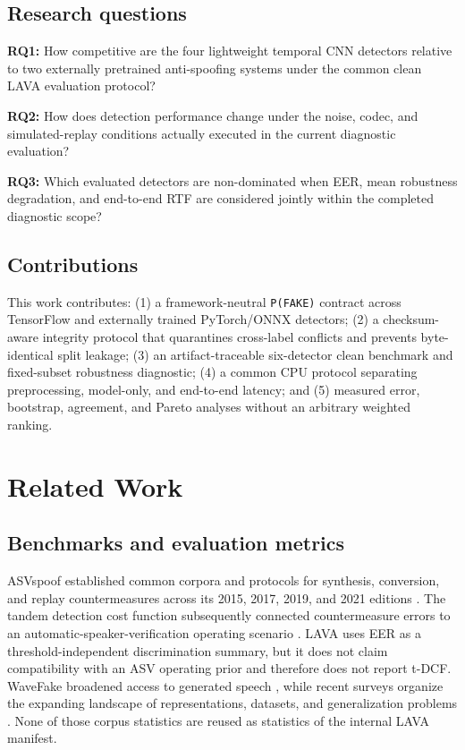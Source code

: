 \documentclass[10pt,journal]{IEEEtran}
\begin{document}
\subsection{Research questions}
\textbf{RQ1:} How competitive are the four lightweight temporal CNN detectors relative to two externally pretrained anti-spoofing systems under the common clean LAVA evaluation protocol?

\textbf{RQ2:} How does detection performance change under the noise, codec, and simulated-replay conditions actually executed in the current diagnostic evaluation?

\textbf{RQ3:} Which evaluated detectors are non-dominated when EER, mean robustness degradation, and end-to-end RTF are considered jointly within the completed diagnostic scope?

\subsection{Contributions}
This work contributes: (1) a framework-neutral \texttt{P(FAKE)} contract across TensorFlow and externally trained PyTorch/ONNX detectors; (2) a checksum-aware integrity protocol that quarantines cross-label conflicts and prevents byte-identical split leakage; (3) an artifact-traceable six-detector clean benchmark and fixed-subset robustness diagnostic; (4) a common CPU protocol separating preprocessing, model-only, and end-to-end latency; and (5) measured error, bootstrap, agreement, and Pareto analyses without an arbitrary weighted ranking.

\section{Related Work}
\subsection{Benchmarks and evaluation metrics}
ASVspoof established common corpora and protocols for synthesis, conversion, and replay countermeasures across its 2015, 2017, 2019, and 2021 editions \cite{wu2015asvspoof,kinnunen2017asvspoof,todisco2019asvspoof,yamagishi2021asvspoof}. The tandem detection cost function subsequently connected countermeasure errors to an automatic-speaker-verification operating scenario \cite{kinnunen2018tdcf}. LAVA uses EER as a threshold-independent discrimination summary, but it does not claim compatibility with an ASV operating prior and therefore does not report t-DCF. WaveFake broadened access to generated speech \cite{frank2021wavefake}, while recent surveys organize the expanding landscape of representations, datasets, and generalization problems \cite{yi2023survey,li2024survey}. None of those corpus statistics are reused as statistics of the internal LAVA manifest.
\end{document}
